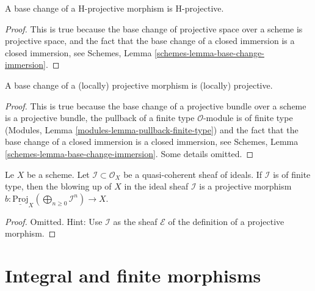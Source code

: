 \begin{lemma}
\label{lemma-H-projective-base-change}
A base change of a H-projective morphism is H-projective.
\end{lemma}

\begin{proof}
This is true because the base change of projective space
over a scheme is projective space, and the fact that the base
change of a closed immersion is a closed immersion, see
Schemes, Lemma \ref{schemes-lemma-base-change-immersion}.
\end{proof}

\begin{lemma}
\label{lemma-base-change-projective}
A base change of a (locally) projective morphism is (locally) projective.
\end{lemma}

\begin{proof}
This is true because the base change of a projective bundle
over a scheme is a projective bundle, the pullback of
a finite type $\mathcal{O}$-module is of finite type
(Modules, Lemma \ref{modules-lemma-pullback-finite-type})
and the fact that the base
change of a closed immersion is a closed immersion, see
Schemes, Lemma \ref{schemes-lemma-base-change-immersion}.
Some details omitted.
\end{proof}

\begin{lemma}
\label{lemma-blowing-up-projective}
Le $X$ be a scheme.
Let $\mathcal{I} \subset \mathcal{O}_X$ be a quasi-coherent
sheaf of ideals. If $\mathcal{I}$ is of finite type, then
the blowing up of $X$ in the ideal sheaf $\mathcal{I}$ is
a projective morphism
$b : \underline{\text{Proj}}_X (\bigoplus_{n \geq 0} \mathcal{I}^n) \to X$.
\end{lemma}

\begin{proof}
Omitted. Hint: Use $\mathcal{I}$ as the sheaf $\mathcal{E}$
of the definition of a projective morphism.
\end{proof}











\section{Integral and finite morphisms}
\label{section-integral}

